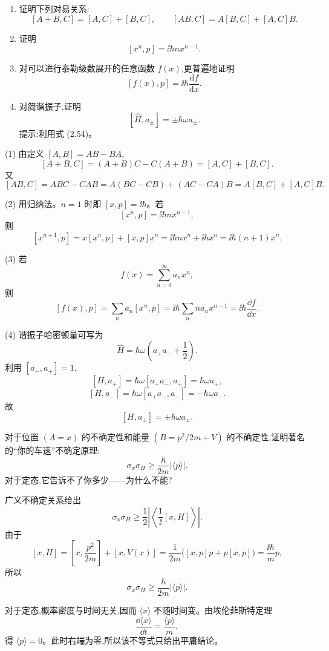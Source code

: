 \begin{question}
\begin{enumerate}
\item 证明下列对易关系:
\[
[A+B,C]=[A,C]+[B,C],\qquad [AB,C]=A[B,C]+[A,C]B.
\]
\item 证明
\[
[x^n,p]=\ii\hbar n x^{n-1}.
\]
\item 对可以进行泰勒级数展开的任意函数 $f(x)$,更普遍地证明
\[
[f(x),p]=\ii\hbar\frac{\mathrm df}{\mathrm dx}.
\tag{3.66}
\]
\item 对简谐振子,证明
\[
[\hat H,a_\pm]=\pm\hbar\omega a_\pm .
\tag{3.67}
\]
提示:利用式 (2.54)。
\end{enumerate}

\par\smallskip
{}

\end{question}
\begin{solution}
(1) 由定义 $[A,B]=AB-BA$,
\[
[A+B,C]=(A+B)C-C(A+B)=[A,C]+[B,C].
\]
又
\[
[AB,C]=ABC-CAB=A(BC-CB)+(AC-CA)B=A[B,C]+[A,C]B.
\]

(2) 用归纳法。$n=1$ 时即 $[x,p]=\ii\hbar$。若
\[
[x^n,p]=\ii\hbar n x^{n-1},
\]
则
\[
[x^{n+1},p]=x[x^n,p]+[x,p]x^n
=\ii\hbar n x^n+\ii\hbar x^n
=\ii\hbar(n+1)x^n.
\]

(3) 若
\[
f(x)=\sum_{n=0}^{\infty}a_nx^n,
\]
则
\[
[f(x),p]=\sum_n a_n[x^n,p]
=\ii\hbar\sum_n n a_nx^{n-1}
=\ii\hbar\frac{\dd f}{\dd x}.
\]

(4) 谐振子哈密顿量可写为
\[
\hat H=\hbar\omega\left(a_+a_-+\frac12\right).
\]
利用 $[a_-,a_+]=1$,
\[
[H,a_+]=\hbar\omega[a_+a_-,a_+]=\hbar\omega a_+,
\]
\[
[H,a_-]=\hbar\omega[a_+a_-,a_-]=-\hbar\omega a_-.
\]
故
\[
\boxed{[H,a_\pm]=\pm\hbar\omega a_\pm.}
\]
\end{solution}

\begin{question}
对于位置 $(A=x)$ 的不确定性和能量 $(B=p^2/2m+V)$ 的不确定性,证明著名的“你的车速”不确定原理:
\[
\sigma_x\sigma_H\geq \frac{\hbar}{2m}|\langle p\rangle|.
\]
对于定态,它告诉不了你多少——为什么不能?
\end{question}
\begin{solution}
广义不确定关系给出
\[
\sigma_x\sigma_H\ge \frac12\left|\left\langle\frac1\ii[x,H]\right\rangle\right|.
\]
由于
\[
[x,H]=\left[x,\frac{p^2}{2m}\right]+[x,V(x)]
=\frac1{2m}\bigl([x,p]p+p[x,p]\bigr)
=\frac{\ii\hbar}{m}p,
\]
所以
\[
\boxed{\sigma_x\sigma_H\ge \frac{\hbar}{2m}|\langle p\rangle|.}
\]

对于定态,概率密度与时间无关,因而 $\langle x\rangle$ 不随时间变。由埃伦菲斯特定理
\[
\frac{\dd\langle x\rangle}{\dd t}=\frac{\langle p\rangle}{m},
\]
得 $\langle p\rangle=0$。此时右端为零,所以该不等式只给出平庸结论。
\end{solution}

